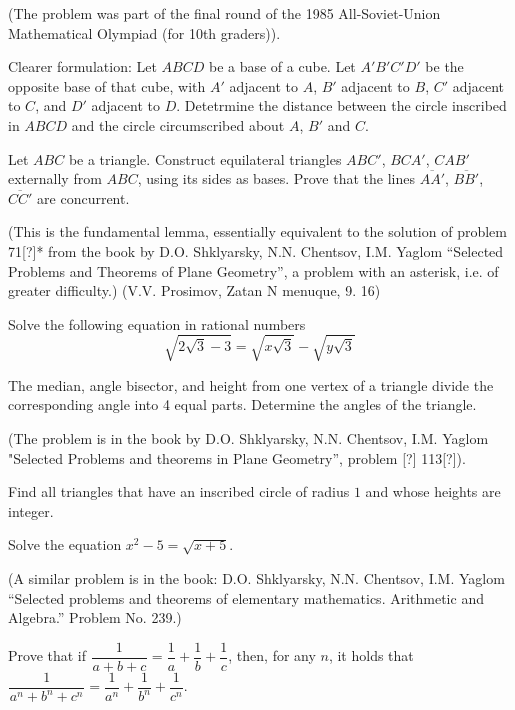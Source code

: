 \documentclass{article}
\begin{document}
(The problem was part of the final round of the 1985 All-Soviet-Union Mathematical Olympiad (for 10th graders)).

Clearer formulation: \newline
Let $ABCD$ be a base of a cube.
Let $A' B' C' D'$ be the opposite base of that cube,
with $A'$ adjacent to $A$,
$B'$ adjacent to $B$,
$C'$ adjacent to $C$,
and $D'$ adjacent to $D$.
Detetrmine the distance between the circle inscribed in $ABCD$
and the circle circumscribed about $A$, $B'$ and $C$.


\problem
Let $ABC$ be a triangle.
Construct equilateral triangles $A B C'$, $B C A'$, $C A B'$
externally from $ABC$, using its sides as bases.
Prove that the lines $\overline{A A'}$, $\overline{B B'}$, $\overline{C C'}$ are concurrent.

(This is the fundamental lemma, essentially equivalent to the solution of problem 71[?]*
from the book by D.O. Shklyarsky, N.N. Chentsov, I.M. Yaglom ``Selected Problems and Theorems of Plane Geometry'',
a problem with an asterisk, i.e. of greater difficulty.) \newline
(V.V. Prosimov, Zatan N menuque, 9. 16)


\problem
Solve the following equation in rational numbers
\begin{equation*}
  \sqrt{2 \sqrt{3} - 3} = \sqrt{x \sqrt{3}} - \sqrt{y \sqrt{3}}
\end{equation*}


\problem
The median, angle bisector, and height from one vertex of a triangle
divide the corresponding angle into 4 equal parts.
Determine the angles of the triangle.

(The problem is in the book by D.O. Shklyarsky, N.N. Chentsov, I.M. Yaglom "Selected Problems and theorems in Plane Geometry'', problem [?] 113[?]).


\problem
Find all triangles that have an inscribed circle of radius $1$
and whose heights are integer.


\problem
Solve the equation
$x^2 - 5 = \sqrt{x + 5}$.

(A similar problem is in the book:
D.O. Shklyarsky, N.N. Chentsov, I.M. Yaglom
``Selected problems and theorems of elementary mathematics. Arithmetic and Algebra.''
Problem No. 239.)


\problem
Prove that if
$\dfrac{1}{\mspace{1mu} a + b + c \mspace{1mu}} = \dfrac{1}{a} + \dfrac{1}{b} + \dfrac{1}{c}$,
then, for any $n$, it holds that
$\dfrac{1}{\mspace{1mu} a^n + b^n + c^n \mspace{1mu}} = \dfrac{1}{a^n} + \dfrac{1}{b^n} + \dfrac{1}{c^n}$.
\end{document}
